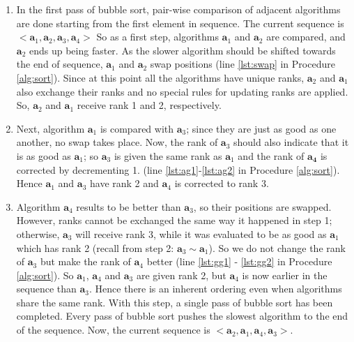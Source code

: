 \documentclass[conference]{IEEEtran}
\begin{document}
\begin{enumerate}
	\item 
          In the first pass of bubble sort, pair-wise comparison of adjacent algorithms are done starting from the first element in sequence. The current sequence is $<\mathbf{a}_1, \mathbf{a}_2, \mathbf{a}_3, \mathbf{a}_4>$
          So as a first step, algorithms $\mathbf{a}_1$ and $\mathbf{a}_2$ are compared, and 
          $\mathbf{a}_2$ ends up being faster. As the slower algorithm should be shifted towards the end of sequence, $\mathbf{a}_1$ and $\mathbf{a}_2$ swap positions  (line \ref{lst:swap} in
          Procedure \ref{alg:sort}). Since at this point all the algorithms have unique ranks, $\mathbf{a}_2$ and
          $\mathbf{a}_1$ also exchange their ranks and no special rules for updating ranks are applied.
          So, $\mathbf{a}_2$ and $\mathbf{a}_1$ receive rank 1 and 2, respectively.
	
	\item Next, algorithm $\mathbf{a}_1$ is compared with $\mathbf{a}_3$;
          since they are just as good as one another, 
          no swap takes place. Now, the rank of $\mathbf{a}_3$ should also indicate that it is as good as $\mathbf{a}_1$;
          so $\mathbf{a}_3$ is given the same rank as $\mathbf{a}_1$ 
            and the rank of $\mathbf{a_4}$ is corrected by
         decrementing 1. (line \ref{lst:ag1}-\ref{lst:ag2} in Procedure \ref{alg:sort}). Hence $\mathbf{a}_1$ and $\mathbf{a}_3$ have rank 2 and $\mathbf{a}_4$ is corrected to rank 3.
	
	\item Algorithm $\mathbf{a}_4$ results to be better than $\mathbf{a}_3$, so their positions are
          swapped. However, ranks cannot be exchanged the same way it happened in step 1;
          otherwise, $\mathbf{a}_3$ will receive rank 3, while it was evaluated to be
          as good as $\mathbf{a}_1$ which has rank 2 (recall from step 2: $\mathbf{a}_3 \sim \mathbf{a}_1$). So
          we do not change the rank of $\mathbf{a}_3$ but make the rank of $\mathbf{a}_4$ better (line \ref{lst:gg1} - \ref{lst:gg2} in Procedure \ref{alg:sort}). So  $\mathbf{a}_1$,  $\mathbf{a}_4$ and  $\mathbf{a}_3$ are given rank 2, but $\mathbf{a}_4$ is now earlier in the sequence than $\mathbf{a}_3$. Hence there is an inherent ordering even when algorithms share the same rank. With this step, a single pass of bubble sort has been completed. Every pass of bubble sort pushes the slowest algorithm to the end of the sequence. Now, the current sequence is $<\mathbf{a}_2, \mathbf{a}_1, \mathbf{a}_4, \mathbf{a}_3>$.
		

\end{enumerate}
\end{document}
